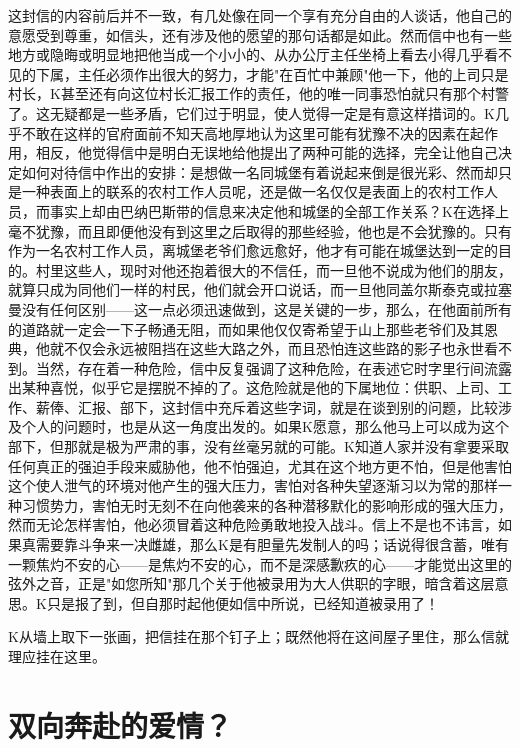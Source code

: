 \documentclass[12pt,a4paper]{article}
\begin{document}
这封信的内容前后并不一致，有几处像在同一个享有充分自由的人谈话，他自己的意愿受到尊重，如信头，还有涉及他的愿望的那句话都是如此。然而信中也有一些地方或隐晦或明显地把他当成一个小小的、从办公厅主任坐椅上看去小得几乎看不见的下属，主任必须作出很大的努力，才能"在百忙中兼顾"他一下，他的上司只是村长，K甚至还有向这位村长汇报工作的责任，他的唯一同事恐怕就只有那个村警了。这无疑都是一些矛盾，它们过于明显，使人觉得一定是有意这样措词的。K几乎不敢在这样的官府面前不知天高地厚地认为这里可能有犹豫不决的因素在起作用，相反，他觉得信中是明白无误地给他提出了两种可能的选择，完全让他自己决定如何对待信中作出的安排：是想做一名同城堡有着说起来倒是很光彩、然而却只是一种表面上的联系的农村工作人员呢，还是做一名仅仅是表面上的农村工作人员，而事实上却由巴纳巴斯带的信息来决定他和城堡的全部工作关系？K在选择上毫不犹豫，而且即便他没有到这里之后取得的那些经验，他也是不会犹豫的。只有作为一名农村工作人员，离城堡老爷们愈远愈好，他才有可能在城堡达到一定的目的。村里这些人，现时对他还抱着很大的不信任，而一旦他不说成为他们的朋友，就算只成为同他们一样的村民，他们就会开口说话，而一旦他同盖尔斯泰克或拉塞曼没有任何区别——这一点必须迅速做到，这是关键的一步，那么，在他面前所有的道路就一定会一下子畅通无阻，而如果他仅仅寄希望于山上那些老爷们及其恩典，他就不仅会永远被阻挡在这些大路之外，而且恐怕连这些路的影子也永世看不到。当然，存在着一种危险，信中反复强调了这种危险，在表述它时字里行间流露出某种喜悦，似乎它是摆脱不掉的了。这危险就是他的下属地位：供职、上司、工作、薪俸、汇报、部下，这封信中充斥着这些字词，就是在谈到别的问题，比较涉及个人的问题时，也是从这一角度出发的。如果K愿意，那么他马上可以成为这个部下，但那就是极为严肃的事，没有丝毫另就的可能。K知道人家并没有拿要采取任何真正的强迫手段来威胁他，他不怕强迫，尤其在这个地方更不怕，但是他害怕这个使人泄气的环境对他产生的强大压力，害怕对各种失望逐渐习以为常的那样一种习惯势力，害怕无时无刻不在向他袭来的各种潜移默化的影响形成的强大压力，然而无论怎样害怕，他必须冒着这种危险勇敢地投入战斗。信上不是也不讳言，如果真需要靠斗争来一决雌雄，那么K是有胆量先发制人的吗；话说得很含蓄，唯有一颗焦灼不安的心——是焦灼不安的心，而不是深感歉疚的心——才能觉出这里的弦外之音，正是"如您所知"那几个关于他被录用为大人供职的字眼，暗含着这层意思。K只是报了到，但自那时起他便如信中所说，已经知道被录用了！

K从墙上取下一张画，把信挂在那个钉子上；既然他将在这间屋子里住，那么信就理应挂在这里。
\par{}
\newpage
\section{双向奔赴的爱情？}
\vspace{0.5em}
\vspace{0.3em}
\end{document}
